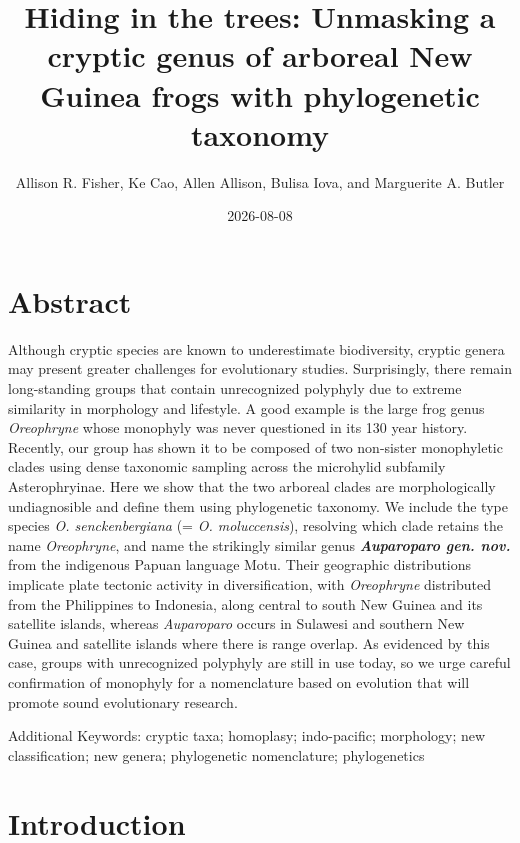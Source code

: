 \documentclass[
  letterpaper,
  DIV=11,
  numbers=noendperiod]{scrartcl}
\title{Hiding in the trees: Unmasking a cryptic genus of arboreal New
Guinea frogs with phylogenetic taxonomy}
\author{Allison R. Fisher, Ke Cao, Allen Allison, Bulisa Iova, and
Marguerite A. Butler}
\date{2026-08-08}
\begin{document}
\maketitle


\newpage{}

\section{Abstract}\label{abstract}

Although cryptic species are known to underestimate biodiversity,
cryptic genera may present greater challenges for evolutionary studies.
Surprisingly, there remain long-standing groups that contain
unrecognized polyphyly due to extreme similarity in morphology and
lifestyle. A good example is the large frog genus \emph{Oreophryne}
whose monophyly was never questioned in its 130 year history. Recently,
our group has shown it to be composed of two non-sister monophyletic
clades using dense taxonomic sampling across the microhylid subfamily
Asterophryinae. Here we show that the two arboreal clades are
morphologically undiagnosible and define them using phylogenetic
taxonomy. We include the type species \emph{O. senckenbergiana} (=
\emph{O. moluccensis}), resolving which clade retains the name
\emph{Oreophryne}, and name the strikingly similar genus
\textbf{\emph{Auparoparo gen. nov.}} from the indigenous Papuan language
Motu. Their geographic distributions implicate plate tectonic activity
in diversification, with \emph{Oreophryne} distributed from the
Philippines to Indonesia, along central to south New Guinea and its
satellite islands, whereas \emph{Auparoparo} occurs in Sulawesi and
southern New Guinea and satellite islands where there is range overlap.
As evidenced by this case, groups with unrecognized polyphyly are still
in use today, so we urge careful confirmation of monophyly for a
nomenclature based on evolution that will promote sound evolutionary
research.

Additional Keywords: cryptic taxa; homoplasy; indo-pacific; morphology;
new classification; new genera; phylogenetic nomenclature; phylogenetics

\newpage{}

\section{Introduction}\label{introduction}
\end{document}
